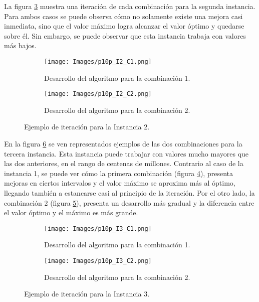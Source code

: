 \documentclass{article}
\begin{document}
\newpage

La figura \ref{fig2} muestra una iteraci\'on de cada combinaci\'on para la segunda instancia. Para ambos casos se puede observa c\'omo no solamente existe una mejora casi inmediata, sino que el valor m\'aximo logra alcanzar el valor \'optimo y quedarse sobre \'el. Sin embargo, se puede observar que esta instancia trabaja con valores m\'as bajos.

\begin{figure}[h]
\centering
    \begin{subfigure}[b]{0.49\textwidth}
         \centering
         \texttt{[image: Images/p10p\_I2\_C1.png]}
         \caption{Desarrollo del algoritmo para la combinaci\'on 1.}
         \label{fig2a}
    \end{subfigure}
    \begin{subfigure}[b]{0.49\textwidth}
         \centering
         \texttt{[image: Images/p10p\_I2\_C2.png]}
         \caption{Desarrollo del algoritmo para la combinaci\'on 2.}
         \label{fig2b}
    \end{subfigure}
    \caption{Ejemplo de iteraci\'on para la Instancia 2.}
    \label{fig2}
\end{figure}

En la figura \ref{fig3} se ven representados ejemplos de las dos combinaciones para la tercera instancia. Esta instancia puede trabajar con valores mucho mayores que las dos anteriores, en el rango de centenas de millones. Contrario al caso de la instancia 1, se puede ver c\'omo la primera combinaci\'on (figura \ref{fig3a}), presenta mejoras en ciertos intervalos y el valor m\'aximo se aproxima m\'as al \'optimo, llegando tambi\'en a estancarse casi al principio de la iteraci\'on. Por el otro lado, la combinaci\'on 2 (figura \ref{fig3b}), presenta un desarrollo m\'as gradual y la diferencia entre el valor \'optimo y el m\'aximo es m\'as grande.

\begin{figure}[h]
\centering
    \begin{subfigure}[b]{0.49\textwidth}
         \centering
         \texttt{[image: Images/p10p\_I3\_C1.png]}
         \caption{Desarrollo del algoritmo para la combinaci\'on 1.}
         \label{fig3a}
    \end{subfigure}
    \begin{subfigure}[b]{0.49\textwidth}
         \centering
         \texttt{[image: Images/p10p\_I3\_C2.png]}
         \caption{Desarrollo del algoritmo para la combinaci\'on 2.}
         \label{fig3b}
    \end{subfigure}
    \caption{Ejemplo de iteraci\'on para la Instancia 3.}
    \label{fig3}
\end{figure}
\end{document}
